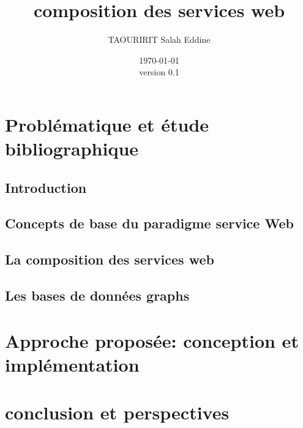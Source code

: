 \documentclass[a4paper, oneside, 12pt]{report}
\author{TAOURIRIT Salah Eddine}
\title{composition des services web}
\date{\today\\version 0.1}
\begin{document}
\maketitle 
\tableofcontents
{}  
\part{Problématique et étude bibliographique}
    \chapter{Introduction}
    
    \chapter{Concepts de base du paradigme service Web} 
    
    \chapter{La composition des services web}
    \chapter{Les bases de données graphs}
\part{Approche proposée: conception et implémentation}  %
\part{conclusion et perspectives}


\end{document}
